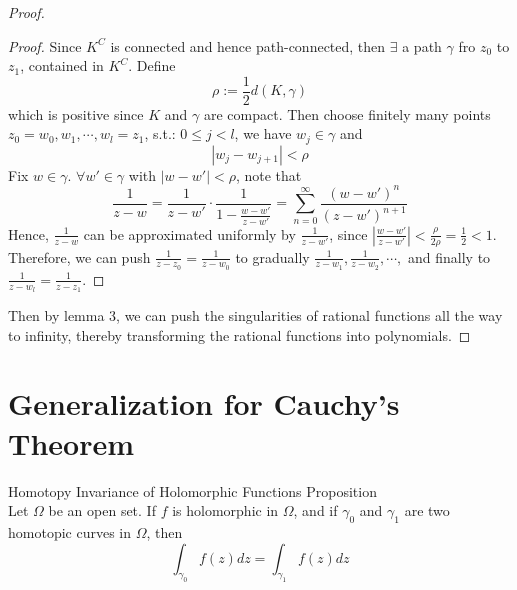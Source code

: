 \begin{proof}
\begin{proof}
        Since $K^C$ is connected and hence path-connected, then $\exists$ a path $\gamma$ fro $z_0$ to $z_1$, contained in $K^C$. Define
        \[
        \rho:= \frac{1}{2} d(K,\gamma)
        \]
        which is positive since $K$ and $\gamma$ are compact. Then choose finitely many points $z_0=w_0, w_1 ,\cdots, w_l=z_1$, s.t.: $0\leq j<l$, we have $w_j\in \gamma$ and 
        \[
        |w_j- w_{j+1}|<\rho
        \]
        Fix $w\in \gamma$. $\forall w'\in \gamma$ with $|w-w'|<\rho$, note that
        \[
        \frac{1}{z-w}= \frac{1}{z-w'} \cdot \frac{1}{1-\frac{w-w'}{z-w'}}= \sum_{n=0} ^\infty \frac{(w-w')^n}{(z-w')^{n+1}}
        \]
        Hence, $\frac{1}{z-w}$ can be approximated uniformly by $\frac{1}{z-w'}$, since $|\frac{w-w'}{z-w'}|< \frac{\rho}{2\rho} =\frac{1}{2}<1$. Therefore, we can push $\frac{1}{z-z_0}=\frac{1}{z-w_0}$ to gradually $\frac{1}{z-w_1} ,\frac{1}{z-w_2} ,\cdots,$ and finally to $\frac{1}{z-w_l}=\frac{1}{z-z_1}$.
    \end{proof}
    Then by lemma 3, we can push the singularities of rational functions all the way to infinity, thereby transforming the rational functions into polynomials.
\end{proof}

\section{Generalization for Cauchy's Theorem}

\begin{proposition}{Homotopy Invariance of Holomorphic Functions Proposition}\\
Let $\Omega$ be an open set. If $f$ is holomorphic in $\Omega$, and if $\gamma _0$ and $\gamma_1$ are two homotopic curves in $\Omega$, then
\[
\int_{\gamma_0} f(z)dz= \int_{\gamma_1} f(z)dz
\]
\end{proposition}

